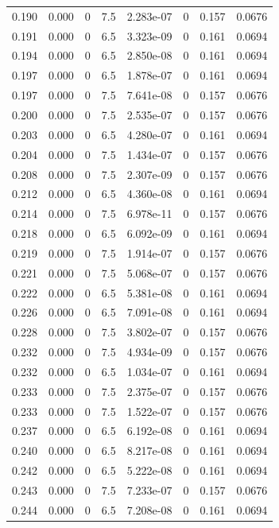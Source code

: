 \documentclass[preview]{standalone}
\begin{document}
{{{\begin{tabular}{L{1.2cm}C{1.2cm} C{0.3cm}C{0.5cm} C{1.4cm}C{1.4cm} C{1.4cm}C{1.4cm}}
  0.190  &  0.000  & 0     & 7.5 &  2.283e-07  & 0  & 0.157 &  0.0676   \\ 
  0.191  &  0.000  & 0     & 6.5 &  3.323e-09  & 0  & 0.161 &  0.0694   \\ 
  0.194  &  0.000  & 0     & 6.5 &  2.850e-08  & 0  & 0.161 &  0.0694   \\ 
  0.197  &  0.000  & 0     & 6.5 &  1.878e-07  & 0  & 0.161 &  0.0694   \\ 
  0.197  &  0.000  & 0     & 7.5 &  7.641e-08  & 0  & 0.157 &  0.0676   \\ 
  0.200  &  0.000  & 0     & 7.5 &  2.535e-07  & 0  & 0.157 &  0.0676   \\ 
  0.203  &  0.000  & 0     & 6.5 &  4.280e-07  & 0  & 0.161 &  0.0694   \\ 
  0.204  &  0.000  & 0     & 7.5 &  1.434e-07  & 0  & 0.157 &  0.0676   \\ 
  0.208  &  0.000  & 0     & 7.5 &  2.307e-09  & 0  & 0.157 &  0.0676   \\ 
  0.212  &  0.000  & 0     & 6.5 &  4.360e-08  & 0  & 0.161 &  0.0694   \\ 
  0.214  &  0.000  & 0     & 7.5 &  6.978e-11  & 0  & 0.157 &  0.0676   \\ 
  0.218  &  0.000  & 0     & 6.5 &  6.092e-09  & 0  & 0.161 &  0.0694   \\ 
  0.219  &  0.000  & 0     & 7.5 &  1.914e-07  & 0  & 0.157 &  0.0676   \\ 
  0.221  &  0.000  & 0     & 7.5 &  5.068e-07  & 0  & 0.157 &  0.0676   \\ 
  0.222  &  0.000  & 0     & 6.5 &  5.381e-08  & 0  & 0.161 &  0.0694   \\ 
  0.226  &  0.000  & 0     & 6.5 &  7.091e-08  & 0  & 0.161 &  0.0694   \\ 
  0.228  &  0.000  & 0     & 7.5 &  3.802e-07  & 0  & 0.157 &  0.0676   \\ 
  0.232  &  0.000  & 0     & 7.5 &  4.934e-09  & 0  & 0.157 &  0.0676   \\ 
  0.232  &  0.000  & 0     & 6.5 &  1.034e-07  & 0  & 0.161 &  0.0694   \\ 
  0.233  &  0.000  & 0     & 7.5 &  2.375e-07  & 0  & 0.157 &  0.0676   \\ 
  0.233  &  0.000  & 0     & 7.5 &  1.522e-07  & 0  & 0.157 &  0.0676   \\ 
  0.237  &  0.000  & 0     & 6.5 &  6.192e-08  & 0  & 0.161 &  0.0694   \\ 
  0.240  &  0.000  & 0     & 6.5 &  8.217e-08  & 0  & 0.161 &  0.0694   \\ 
  0.242  &  0.000  & 0     & 6.5 &  5.222e-08  & 0  & 0.161 &  0.0694   \\ 
  0.243  &  0.000  & 0     & 7.5 &  7.233e-07  & 0  & 0.157 &  0.0676   \\ 
  0.244  &  0.000  & 0     & 6.5 &  7.208e-08  & 0  & 0.161 &  0.0694   \\ 
\hline 
\end{tabular} 

}}}
\end{document}
